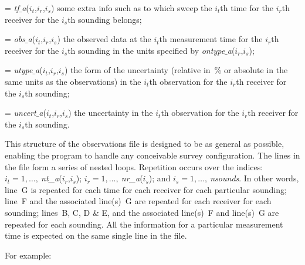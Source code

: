 \medskip
\hangindent=\parindent{}\noindent
{\sl tf$\_$a}($i_t$,$i_r$,$i_s$) some extra info such as to which sweep the $i_t$th time for
the $i_r$th receiver for the $i_s$th sounding belongs;

\medskip
\hangindent=\parindent{}\noindent
{\sl obs$\_$a}($i_t$,$i_r$,$i_s$) the observed data at the $i_t$th measurement time for the
$i_r$th receiver for the $i_s$th sounding in the units specified by {\sl ontype$\_$a}($i_r$,$i_s$);

\medskip
\hangindent=\parindent{}\noindent
{\sl utype$\_$a}($i_t$,$i_r$,$i_s$) the form of the uncertainty (relative in~\% or absolute in
the same units as the observations) in the $i_t$th observation for the $i_r$th receiver for
the $i_s$th sounding;

\medskip
\hangindent=\parindent{}\noindent
{\sl uncert$\_$a}($i_t$,$i_r$,$i_s$) the uncertainty in the $i_t$th observation for the $i_r$th
receiver for the $i_s$th sounding.

\medskip\noindent
This structure of the observations file is designed to be as general as possible, enabling
the program to handle any conceivable survey configuration.
The lines in the file form a series of nested loops.
Repetition occurs over the indices: $i_t=1,\ldots,\>${\sl nt\_a}($i_r$,$i_s$);
$i_r=1,\ldots,\>${\sl nr\_a}($i_s$); and $i_s=1,\ldots,\>${\sl nsounds}.
In other words, line~G is repeated for each time for each receiver for each particular sounding;
line~F and the associated line(s)~G are repeated for each receiver for each sounding; lines~B,
C, D \& E, and the associated line(s)~F and line(s)~G are repeated for each sounding.
All the information for a particular measurement time is expected on the same single line in
the file.

\medskip\noindent
For example:


